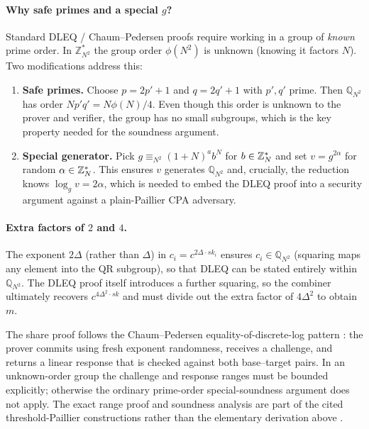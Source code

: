 \paragraph{Why safe primes and a special $g$?}
Standard DLEQ / Chaum--Pedersen proofs require working in a group of \emph{known} prime
order.  In $\mathbb{Z}_{N^2}^*$ the group order $\phi(N^2)$ is unknown (knowing it
factors $N$).  Two modifications address this:
\begin{enumerate}
  \item \textbf{Safe primes.} Choose $p = 2p'+1$ and $q = 2q'+1$ with $p', q'$ prime.
    Then $\mathbb{Q}_{N^2}$ has order $N p'q'=N\phi(N)/4$. Even though this order is unknown to the prover and verifier, the group has
    no small subgroups, which is the key property needed for the soundness argument.
  \item \textbf{Special generator.} Pick $g \equiv_{N^2} (1+N)^a b^N$ for $b \in \mathbb{Z}_N^*$
    and set $v = g^{2\alpha}$ for random $\alpha \in \mathbb{Z}_N^*$.  This ensures $v$ generates
    $\mathbb{Q}_{N^2}$ and, crucially, the reduction knows $\log_g v = 2\alpha$, which is
    needed to embed the DLEQ proof into a security argument against a plain-Paillier
    CPA adversary.
\end{enumerate}

\paragraph{Extra factors of $2$ and $4$.}
The exponent $2\Delta$ (rather than $\Delta$) in $c_i = c^{2\Delta \cdot sk_i}$ ensures
$c_i \in \mathbb{Q}_{N^2}$ (squaring maps any element into the QR subgroup), so that
DLEQ can be stated entirely within $\mathbb{Q}_{N^2}$.  The DLEQ proof itself introduces
a further squaring, so the combiner ultimately recovers $c^{4\Delta^2 \cdot sk}$ and must
divide out the extra factor of $4\Delta^2$ to obtain $m$.

The share proof follows the Chaum--Pedersen equality-of-discrete-log pattern \cite{ChaumPedersen1992}: the prover commits using fresh exponent randomness, receives a challenge, and returns a linear response that is checked against both base--target pairs. In an unknown-order group the challenge and response ranges must be bounded explicitly; otherwise the ordinary prime-order special-soundness argument does not apply. The exact range proof and soundness analysis are part of the cited threshold-Paillier constructions rather than the elementary derivation above \cite{FouquePoupardStern2000,DamgardJurik2001}.

